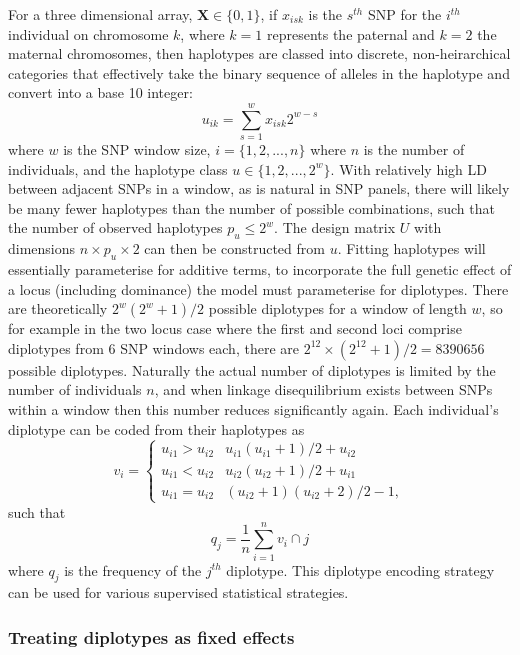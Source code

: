 For a three dimensional array, $\mathbf{X} \in \{0,1\}$, if $x_{isk}$ is the $s^{th}$ SNP for the $i^{th}$ individual on chromosome $k$, where $k=1$ represents the paternal and $k=2$ the maternal chromosomes, then haplotypes are classed into discrete, non-heirarchical categories that effectively take the binary sequence of alleles in the haplotype and convert into a base 10 integer:
\begin{equation}
u_{ik} = \sum_{s=1}^{w} x_{isk}2^{w-s}
\end{equation}
where $w$ is the SNP window size, $i = \{1, 2, ..., n\}$ where $n$ is the number of individuals, and the haplotype class $u \in \{1, 2, ..., 2^{w}\}$. With relatively high LD between adjacent SNPs in a window, as is natural in SNP panels, there will likely be many fewer haplotypes than the number of possible combinations, such that the number of observed haplotypes $p_{u} \leq 2^w$. The design matrix $U$ with dimensions $n \times p_{u} \times 2$ can then be constructed from $u$. Fitting haplotypes will essentially parameterise for additive terms, to incorporate the full genetic effect of a locus (including dominance) the model must parameterise for diplotypes. There are theoretically $2^w(2^w+1) / 2$ possible diplotypes for a window of length $w$, so for example in the two locus case where the first and second loci comprise diplotypes from 6 SNP windows each, there are $2^{12} \times (2^{12} + 1) / 2 = 8390656$ possible diplotypes. Naturally the actual number of diplotypes is limited by the number of individuals $n$, and when linkage disequilibrium exists between SNPs within a window then this number reduces significantly again. Each individual's diplotype can be coded from their haplotypes as
\begin{equation}
v_{i} = \left\{
\begin{array}{ll}
u_{i1} > u_{i2} & u_{i1}(u_{i1}+1) / 2 + u_{i2} \\
u_{i1} < u_{i2} & u_{i2}(u_{i2}+1) / 2 + u_{i1} \\
u_{i1} = u_{i2} & (u_{i2}+1)(u_{i2}+2) / 2 -1,
\end{array}\right.
\end{equation}
such that
\begin{equation}
q_{j} = \frac{1}{n} \sum^{n}_{i=1} v_{i} \cap j
\end{equation}
where $q_{j}$ is the frequency of the $j^{th}$ diplotype. This diplotype encoding strategy can be used for various supervised statistical strategies.


\subsubsection{Treating diplotypes as fixed effects}
\label{sec:dip_fixed}

